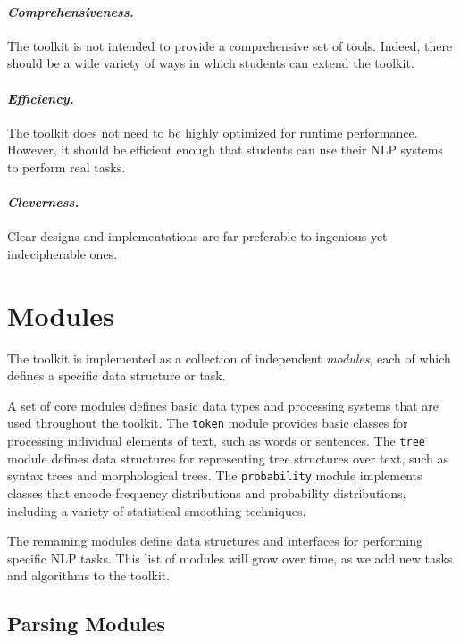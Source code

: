 \documentclass[11pt]{article}
\begin{document}
\paragraph{\textit{Comprehensiveness.}} The toolkit is not intended to
provide a comprehensive set of tools.  Indeed, there should be a wide
variety of ways in which students can extend the toolkit.

\paragraph{\textit{Efficiency.}} The toolkit does not need to be highly
optimized for runtime performance.  However, it should be efficient
enough that students can use their NLP systems to perform real tasks.

\paragraph{\textit{Cleverness.}} Clear designs and implementations are
far preferable to ingenious yet indecipherable ones.

\section{Modules}
\label{sec:modules}

The toolkit is implemented as a collection of independent
\emph{modules}, each of which defines a specific data structure or
task.

A set of core modules defines basic data types and processing systems
that are used throughout the toolkit.  The \texttt{token} module
provides basic classes for processing individual elements of text,
such as words or sentences.  The \texttt{tree} module defines data
structures for representing tree structures over text, such as syntax
trees and morphological trees.  The \texttt{probability} module
implements classes that encode frequency distributions and probability
distributions, including a variety of statistical smoothing
techniques.

The remaining modules define data structures and interfaces for
performing specific NLP tasks.  This list of modules will grow over
time, as we add new tasks and algorithms to the toolkit.

\subsection*{Parsing Modules}
\end{document}

